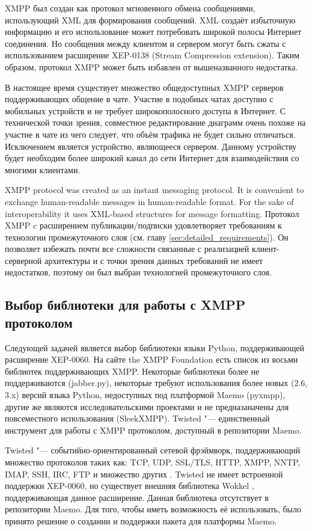 XMPP был создан как протокол мгновенного обмена сообщениями, использующий XML
для формирования сообщений. XML создаёт избыточную информацию и его
использование может потребовать широкой полосы Интернет соединения. Но сообщения
между клиентом и сервером могут быть сжаты с использованием расширение XEP-0138
(Stream Compression extension). Таким образом, протокол XMPP может быть избавлен
от вышеназванного недостатка.

В настоящее время существует множество общедоступных XMPP серверов
поддерживающих общение в чате. Участие в подобных чатах доступно с мобильных
устройств и не требует широкополосного доступа в Интернет. С технической точки
зрения, совместное редактирование диаграмм очень похоже на участие в чате из
чего следует, что объём трафика не будет сильно отличаться. Исключением является
устройство, являющееся сервером. Данному устройству будет необходим более
широкий канал до сети Интернет для взаимодействия со многими клиентами.

XMPP protocol was created as an instant messaging protocol. It is convenient to
exchange human-readable messages in human-readable format. For the sake of
interoperability it uses XML-based structures for message formatting. Протокол
XMPP c расширением публикации/подписки удовлетворяет требованиям к технологии
промежуточного слоя (см. главу \ref{sec:detailed_requirements}). Он позволяет
избежать почти все сложности связанные с реализацией клиент-серверной
архитектуры и с точки зрения данных требований не имеет недостатков, поэтому он
был выбран технологией промежуточного слоя.

\subsection{Выбор библиотеки для работы с XMPP протоколом}
Следующей задачей является выбор библиотеки языки Python, поддерживающей
расширение XEP-0060. На сайте the XMPP Foundation \cite{xmpp} есть список из
восьми библиотек поддерживающих XMPP. Некоторые библиотеки более не
поддерживаются (jabber.py), некоторые требуют использования более новых (2.6,
3.x) версий языка Python, недоступных под платформой Maemo (pyxmpp), другие же
являются исследовательскими проектами и не предназаначены для повсеместного
использования (SleekXMPP). Twisted "--- единственный инструмент для работы с
XMPP протоколом, доступный в репозитории Maemo.

Twisted "--- событийно-ориентированный сетевой фрэймворк, поддерживающий
множество протоколов таких как: TCP, UDP, SSL/TLS, HTTP, XMPP, NNTP, IMAP, SSH,
IRC, FTP и множество других \cite{twisted}. Twisted не имеет встроенной
поддержки XEP-0060, но существует внешняя библиотека Wokkel \cite{wokkel},
поддерживающая данное расширение. Данная библиотека отсутствует в репозитории
Maemo. Для того, чтобы иметь возможность её использовать, было принято решение о
создании и поддержки пакета для платформы Maemo.

